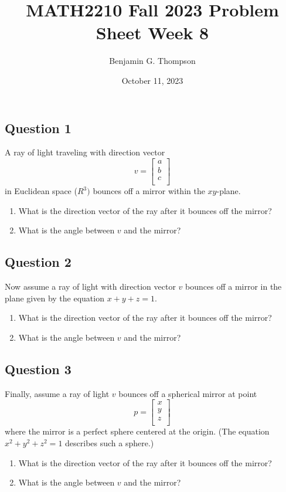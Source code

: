 \documentclass[12pt, a4paper]{article}
\title{MATH2210 Fall 2023 Problem Sheet Week 8}
\author{Benjamin G. Thompson}
\date{October 11, 2023}
\begin{document}
\subsection*{Question 1}
A ray of light traveling with direction vector
\[
v = \begin{bmatrix}
a \\
b \\
c \\
\end{bmatrix}
\]
in Euclidean space ($R^3)$ bounces off a mirror within the $xy$-plane.
\begin{enumerate}
\item What is the direction vector of the ray after it bounces off the mirror?
\item What is the angle between $v$ and the mirror?
\end{enumerate}

\subsection*{Question 2}
Now assume a ray of light with direction vector $v$ bounces off a mirror in the plane given by the equation $x + y + z = 1$.
\begin{enumerate}
\item What is the direction vector of the ray after it bounces off the mirror?
\item What is the angle between $v$ and the mirror?
\end{enumerate}

\subsection*{Question 3}
Finally, assume a ray of light $v$ bounces off a spherical mirror at point
\[
p = \begin{bmatrix}
x \\
y \\
z \\
\end{bmatrix}
\] where the mirror is a perfect sphere centered at the origin. (The equation $x^2 + y^2 + z^2 = 1$ describes such a sphere.)
\begin{enumerate}
\item What is the direction vector of the ray after it bounces off the mirror?
\item What is the angle between $v$ and the mirror?
\end{enumerate}
\end{document}
